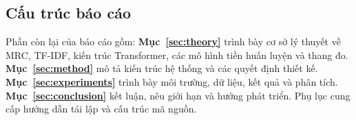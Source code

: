 \subsection{Cấu trúc báo cáo}

Phần còn lại của báo cáo gồm: \textbf{Mục~\ref{sec:theory}} trình bày cơ sở lý thuyết
về MRC, TF-IDF, kiến trúc Transformer, các mô hình tiền huấn luyện và thang đo.
\textbf{Mục~\ref{sec:method}} mô tả kiến trúc hệ thống và các quyết định thiết kế.
\textbf{Mục~\ref{sec:experiments}} trình bày môi trường, dữ liệu, kết quả và phân tích.
\textbf{Mục~\ref{sec:conclusion}} kết luận, nêu giới hạn và hướng phát triển.
Phụ lục cung cấp hướng dẫn tái lập và cấu trúc mã nguồn.
